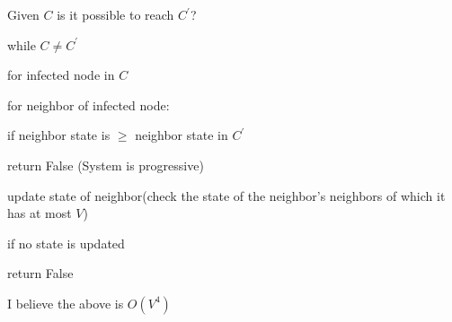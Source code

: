 Given $C$ is it possible to reach $C^{'}$?

while $C \neq C^{'}$

\indent for infected node in $C$

\indent\indent for neighbor of infected node:

\indent\indent\indent if neighbor state is $\geq$ neighbor state in $C^{'}$

\indent\indent\indent\indent return False (System is progressive)

\indent\indent\indent update state of neighbor(check the state of the neighbor's neighbors of which it has at most $V$)

\indent if no state is updated

\indent\indent return False


I believe the above is $O(V^{4})$